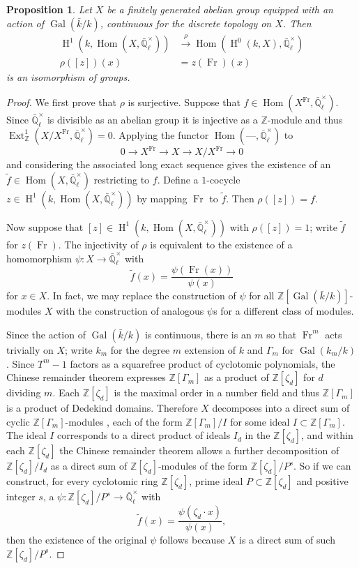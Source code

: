 \documentclass[11pt]{amsart}
\theoremstyle{plain}
\newtheorem{proposition}[theorem]{Proposition}
\theoremstyle{definition}
\theoremstyle{remark}
\newcommand{\ZZ}{{\mathbb{Z}}}
\newcommand{\EE}{\mathbb{\bar Q}_\ell}
\newcommand{\bFq}{\bar{k}}
\newcommand{\Fq}{k}
\newcommand{\Fqm}{k_m}
\DeclareMathOperator{\Gal}{Gal}
\newcommand{\Frob}{{\operatorname{Fr}}}
\DeclareMathOperator{\Hom}{Hom}
\DeclareMathOperator{\Ext}{Ext}
\DeclareMathOperator{\Hh}{H}
\begin{document}
\begin{proposition}\label{prop:X}
  Let $X$ be a finitely generated abelian group equipped with an
  action of $\Gal(\bFq/\Fq)$, continuous for the discrete topology on
  $X$.  Then
  \begin{align*}
    \Hh^1(\Fq, \Hom(X, \EE^\times)) &\xrightarrow{\rho} \Hom(\Hh^0(\Fq, X), \EE^\times) \\
    \rho([z])(x) &= z(\Frob)(x)
  \end{align*}
  is an isomorphism of groups.
\end{proposition}
\begin{proof}
  We first prove that $\rho$ is surjective.  Suppose that
  $f \in \Hom(X^\Frob, \EE^\times).$ Since $\EE^\times$ is divisible
  as an abelian group it is injective as a $\ZZ$-module and thus
  $\Ext^1_{\ZZ}(X/X^\Frob, \EE^\times) = 0$.  Applying the functor
  $\Hom(\mbox{---}, \EE^\times)$ to
  $$0 \rightarrow X^\Frob \rightarrow X \rightarrow X/X^\Frob \rightarrow 0$$
  and considering the associated long exact sequence gives the
  existence of an $\tilde{f} \in \Hom(X, \EE^\times)$ restricting to
  $f$.  Define a $1$-cocycle $z \in \Hh^1(\Fq, \Hom(X,\EE^\times))$ by
  mapping $\Frob$ to $\tilde{f}$.  Then $\rho([z]) = f$.

  Now suppose that $[z] \in \Hh^1(\Fq,\Hom(X,\EE^\times))$ with
  $\rho([z]) = 1$; write $\tilde{f}$ for $z(\Frob)$.  The injectivity
  of $\rho$ is equivalent to the existence of a homomorphism $\psi
  \colon X \rightarrow \EE^\times$ with
  $$\tilde{f}(x) = \frac{\psi(\Frob(x))}{\psi(x)}$$
  for $x \in X$.  In fact, we may replace the construction of $\psi$
  for all $\ZZ[\Gal(\bFq/\Fq)]$-modules $X$ with the construction of
  analogous $\psi$s for a different class of modules.

  Since the action of $\Gal(\bFq/\Fq)$ is continuous, there is an $m$
  so that $\Frob^m$ acts trivially on $X$; write $\Fqm$ for the degree
  $m$ extension of $\Fq$ and $\Gamma_m$ for $\Gal(\Fqm/\Fq)$.  Since
  $T^m-1$ factors as a squarefree product of cyclotomic polynomials,
  the Chinese remainder theorem expresses $\ZZ[\Gamma_m]$ as a product
  of $\ZZ[\zeta_d]$ for $d$ dividing $m$.  Each $\ZZ[\zeta_d]$ is the
  maximal order in a number field and thus $\ZZ[\Gamma_m]$ is a
  product of Dedekind domains.  Therefore $X$ decomposes into a direct
  sum of cyclic $\ZZ[\Gamma_m]$-modules \cite[?]{Brandal}, each of the
  form $\ZZ[\Gamma_m] / I$ for some ideal $I \subset \ZZ[\Gamma_m]$.
  The ideal $I$ corresponds to a direct product of ideals $I_d$ in the
  $\ZZ[\zeta_d]$, and within each $\ZZ[\zeta_d]$ the Chinese remainder
  theorem allows a further decomposition of $\ZZ[\zeta_d] / I_d$ as a
  direct sum of $\ZZ[\zeta_d]$-modules of the form $\ZZ[\zeta_d]/P^s$.
  So if we can construct, for every cyclotomic ring $\ZZ[\zeta_d]$,
  prime ideal $P \subset \ZZ[\zeta_d]$ and positive integer $s$, a
  $\psi \colon \ZZ[\zeta_d]/P^s \rightarrow \EE^\times$ with
  \begin{equation} \label{eq:psi-condition}
    \tilde{f}(x) = \frac{\psi(\zeta_d \cdot x)}{\psi(x)},
  \end{equation}
  then the existence of the original $\psi$ follows because $X$ is a
  direct sum of such $\ZZ[\zeta_d]/P^s$.


\end{proof}
\end{document}
